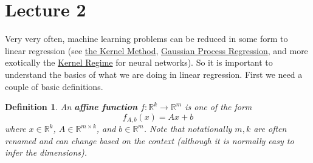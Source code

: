 \documentclass[letterpaper, 12pt]{article}
\newcommand{\R}{\mathbb{R}}	%
\newcommand{\1}{\mathds{1}}	%
\newtheorem{definition}{Definition}[section]
\begin{document}
\section{Lecture 2}
\label{sec:Lecture 2}
Very very often, machine learning problems can be reduced in some form to linear regression (see \href{https://en.wikipedia.org/wiki/Kernel_method}{the Kernel Method}, \href{https://en.wikipedia.org/wiki/Kriging}{Gaussian Process Regression}, and more exotically the \href{https://arxiv.org/pdf/1811.03962}{Kernel Regime} for neural networks). 
So it is important to understand the basics of what we are doing in linear regression. First we need a couple of basic definitions.

\begin{definition}
    \label{def:affine function}
    An \textbf{affine function} \(f: \R^k \to \R^m\) is one of the form
    \[
        f_{A,b}(x) = Ax + b
    \]
    where \(x\in\R^k\), \(A\in\R^{m\times k}\), and \(b \in \R^m\). Note that notationally \(m,k\) are often renamed and can change based on the context (although it is normally easy to infer the dimensions).
\end{definition}
\end{document}
